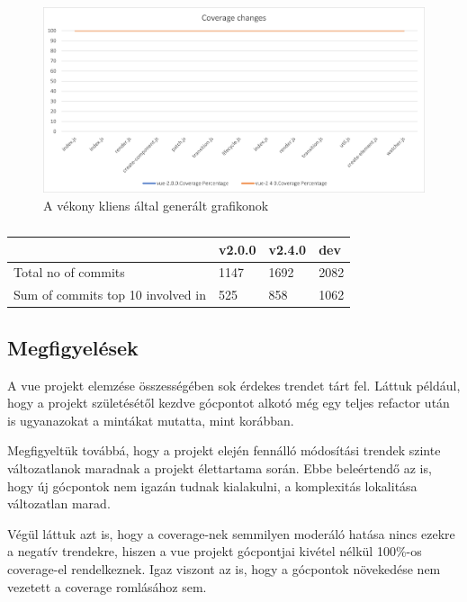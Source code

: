 \begin{figure}[H]
    \centering
    \includegraphics[width=1\textwidth]{images/vue/vue-all-coverage.png}
    \caption{A vékony kliens által generált grafikonok}
    \label{fig:vue-all-coverage}
\end{figure}

\begin{table}[h]
    \centering
    \begin{tabular}{l|l|l|l}
                                          & v2.0.0 & v2.4.0 & dev  \\ \hline
        Total no of commits               & 1147   & 1692   & 2082 \\
        Sum of commits top 10 involved in & 525    & 858    & 1062
    \end{tabular}
    \caption{}\label{tab:my-table}
\end{table}

\subsection{Megfigyelések}

A vue projekt elemzése összességében sok érdekes trendet tárt fel. Láttuk például, hogy a projekt születésétől kezdve gócpontot alkotó  még egy teljes refactor után is ugyanazokat a mintákat mutatta, mint korábban.

Megfigyeltük továbbá, hogy a projekt elején fennálló módosítási trendek szinte változatlanok maradnak a projekt élettartama során. Ebbe beleértendő az is, hogy új gócpontok nem igazán tudnak kialakulni, a komplexitás lokalitása változatlan marad.

Végül láttuk azt is, hogy a coverage-nek semmilyen moderáló hatása nincs ezekre a negatív trendekre, hiszen a vue projekt gócpontjai kivétel nélkül 100\%-os coverage-el rendelkeznek. Igaz viszont az is, hogy a gócpontok növekedése nem vezetett a coverage romlásához sem.

